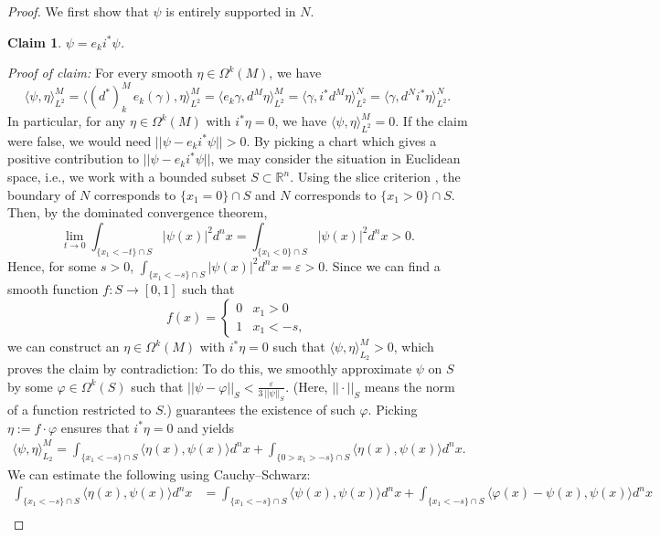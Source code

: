 \documentclass[11pt]{article}
\newtheorem{claim}{Claim}[theorem]
\theoremstyle{definition}
\theoremstyle{remark}
\newcommand{\R}{\mathbb{R}}
\begin{document}
\begin{proof}
    We first show that $\psi$ is entirely supported in $N$. 
\begin{claim}
    $\psi = e_k i^* \psi$. \label{claim:psi}
\end{claim}
    \textit{Proof of claim:} For every smooth $\eta \in \Omega^k(M)$, we have
    $$
        \langle \psi,\eta \rangle_{L^2}^M = \langle (d^*)_k^M \, e_k (\gamma),\eta \rangle_{L^2}^M = \langle e_k \gamma, d^M\eta \rangle_{L^2}^M=\langle \gamma, i^* d^M\eta \rangle_{L^2}^N = \langle \gamma, d^N i^* \eta \rangle_{L^2}^N.
    $$
    In particular, for any $\eta \in \Omega^k(M)$ with $i^* \eta=0$, we have $\langle \psi, \eta \rangle_{L^2}^M=0$. If the claim were false, we would need $||\psi-e_k i^* \psi||>0$. By picking a chart which gives a positive contribution to $||\psi-e_k i^* \psi||$, we may consider the situation in Euclidean space, i.e., we work with a bounded subset $S \subset \R^n$. Using the slice criterion \citep[Theorem 5.8]{lee}, the boundary of $N$ corresponds to $\{x_1=0\}\cap S$ and $N$ corresponds to $\{x_1>0\}\cap S$. Then, by the dominated convergence theorem, 
    $$
    \lim_{t \rightarrow 0} \int_{\{x_1<-t \}\cap S} |\psi(x)|^2 d^nx = \int_{\{x_1<0\}\cap S} |\psi(x)|^2 d^nx>0.
    $$
    Hence, for some $s >0$, $\int_{\{x_1<-s \}\cap S} |\psi(x)|^2 d^nx=\varepsilon >0$. Since we can find a smooth function $f:S \rightarrow [0,1] $ such that $$
    f(x)=\begin{cases}
        0 & x_1>0\\
        1 & x_1<-s,
    \end{cases}
    $$
    we can construct an $\eta \in \Omega^k(M)$ with $i^* \eta=0$ such that $\langle \psi, \eta \rangle_{L_2}^M>0$, which proves the claim by contradiction: To do this, we smoothly approximate $\psi$ on $S$ by some $\varphi \in \Omega^k(S)$ such that $||\psi-\varphi||_S < \frac{\varepsilon}{3 \, ||\psi||_S}$. (Here, $||\cdot||_S$ means the norm of a function restricted to $S$.) \citet[\S5.3, Theorem 3]{evans} guarantees the existence of such $\varphi$. Picking $\eta:=f \cdot \varphi$ ensures that $i^* \eta=0$ and yields
    \begin{align}
        \langle \psi, \eta \rangle_{L_2}^M = \int_{\{ x_1< -s \} \cap S} \langle \eta(x),\psi(x) \rangle d^n x + \int_{\{0> x_1> -s \} \cap S} \langle \eta(x),\psi(x) \rangle d^n x \label{eq:pfderham}.
    \end{align}
    We can estimate the following using Cauchy--Schwarz:
    \begin{align*}
        \int_{\{ x_1< -s \} \cap S} \langle \eta(x),\psi(x) \rangle d^n x &= \int_{\{ x_1< -s \} \cap S} \langle \psi(x),\psi(x) \rangle d^n x + \int_{\{ x_1< -s \} \cap S} \langle \varphi (x) - \psi(x),\psi(x) \rangle d^n x\\

\end{align*}
\end{proof}
\end{document}
